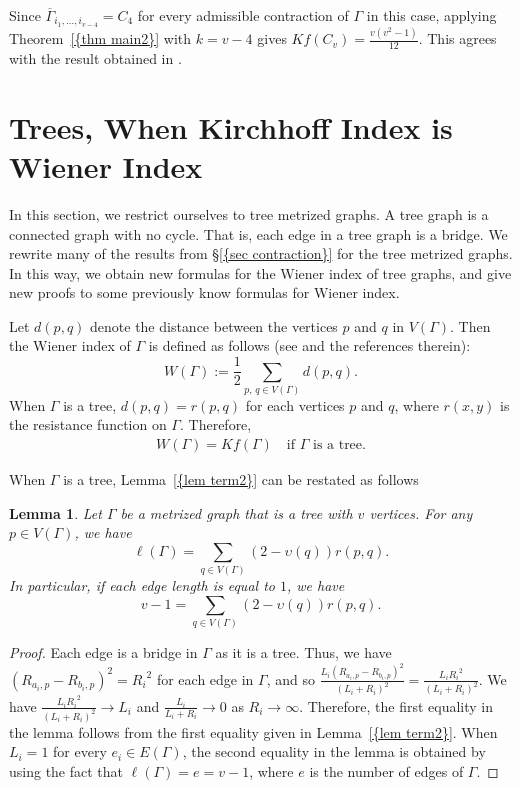 \documentclass[12pt]{amsart}
\newtheorem{lemma}[theorem]{Lemma}
\theoremstyle{example}
\theoremstyle{definition}
\theoremstyle{notation}
\begin{document}
Since ${{\overline{\Gamma}}}_{i_1,\dots, i_{v-4}}=C_4$ for every admissible contraction of ${\Gamma}$ in this case, applying {Theorem~\ref{{thm main2}}} with $k=v-4$ gives
$Kf(C_v)=\frac{v(v^2-1)}{12}$. This agrees with the result obtained in \cite[Equation (5)]{LNT}.

\section{Trees, When Kirchhoff Index is Wiener Index}\label{sec tree}

In this section, we restrict ourselves to tree metrized graphs. A tree graph is a connected graph with no cycle. That is, each edge in a tree graph is a bridge. We rewrite many of the results from {\S\ref{{sec contraction}}} for the tree metrized graphs. In this way, we obtain new formulas for the Wiener index of tree graphs, and give new proofs to some previously know formulas for Wiener index.

Let $d(p,q)$ denote the distance between the vertices $p$ and $q$ in ${V({\Gamma})}$. Then the Wiener index of ${\Gamma}$
is defined as follows (see \cite[page 211]{DEG} and the references therein):
$$W({\Gamma}):=\frac{1}{2} \sum_{p, \, q \in {V({\Gamma})}}d(p,q).$$
When ${\Gamma}$ is a tree, $d(p,q)=r(p,q)$ for each vertices $p$ and $q$, where $r(x,y)$ is the resistance function on ${\Gamma}$.
Therefore,
\begin{equation}\label{eqn wiener and Kirchhoff}
\begin{split}
W({\Gamma})=Kf({\Gamma}) \quad \text{if  ${\Gamma}$ is a tree}.
\end{split}
\end{equation}

When ${\Gamma}$ is a tree, {Lemma~\ref{{lem term2}}} can be restated as follows
\begin{lemma}\label{lem term2fortrees}
Let ${\Gamma}$ be a metrized graph that is a tree with $v$ vertices. For any $p
\in {V({\Gamma})}$, we have
$${\ell ({\Gamma})} = \sum_{q \in {V({\Gamma})}}(2-{\upsilon}(q))r(p,q).$$
In particular, if each edge length is equal to $1$, we have
$$v-1 = \sum_{q \in {V({\Gamma})}}(2-{\upsilon}(q))r(p,q).$$
\end{lemma}
\begin{proof}
Each edge is a bridge in ${\Gamma}$ as it is a tree.
Thus, we have $(R_{a_{i},p}-R_{b_{i},p})^2={R_{i}}^2$ for each edge in ${\Gamma}$, and so $\frac{{L_{i}}(R_{a_{i},p}-R_{b_{i},p})^2}{({L_{i}}+{R_{i}})^2}=\frac{{L_{i}} {R_{i}}^2}{({L_{i}}+{R_{i}})^2}$.
We have $\frac{{L_{i}} {R_{i}}^2}{({L_{i}}+{R_{i}})^2} \longrightarrow {L_{i}}$ and $\frac{L_{i}}{{L_{i}}+{R_{i}}}\longrightarrow 0$ as ${R_{i}} \longrightarrow \infty$.
Therefore, the first equality in the lemma follows from the first equality given in {Lemma~\ref{{lem term2}}}.
When ${L_{i}}=1$ for every $e_i \in {E({\Gamma})}$, the second equality in the lemma is obtained by using the fact that ${\ell ({\Gamma})} = e =v-1$, where $e$ is the number of edges of ${\Gamma}$.
\end{proof}
\end{document}
